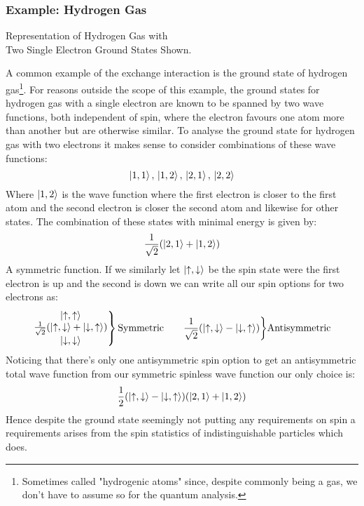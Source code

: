 \subsubsection{Example: Hydrogen Gas}
\begin{center}

Representation of Hydrogen Gas with \\Two Single Electron Ground States Shown.
\end{center}
A common example of the exchange interaction is the ground state of hydrogen gas\footnote{Sometimes called "hydrogenic atoms" since,
despite commonly being a gas,
we don't have to assume so for the quantum analysis.}.
For reasons outside the scope of this example,
the ground states for hydrogen gas with a single electron are known to be spanned by two wave functions,
both independent of spin,
where the electron favours one atom more than another but are otherwise similar.
To analyse the ground state for hydrogen gas with two electrons it makes sense to consider combinations of these wave functions:
\[\left|1,1\right\rangle,\,\left|1,2\right\rangle,\,\left|2,1\right\rangle,\,\left|2,2\right\rangle\]
Where $\left|1,2\right\rangle$ is the wave function where the first electron is closer to the first atom and the second electron is closer the second atom and likewise for other states.
The combination of these states with minimal energy is given by:
\[\frac{1}{\sqrt{2}}(\left|2,1\right\rangle+\left|1,2\right\rangle)\]
A symmetric function.
If we similarly let $\left|\uparrow,\downarrow\right\rangle$ be the spin state were the first electron is up and the second is down we can write all our spin options for two electrons as:
\[\left.\begin{matrix}\left|\uparrow,\uparrow\right\rangle\\\frac{1}{\sqrt{2}}(\left|\uparrow,\downarrow\right\rangle+\left|\downarrow,\uparrow\right\rangle)\\\left|\downarrow,\downarrow\right\rangle\end{matrix}\right\}\text{Symmetric}\quad\quad\frac{1}{\sqrt{2}}(\left|\uparrow,\downarrow\right\rangle-\left|\downarrow,\uparrow\right\rangle)\bigg\}\text{Antisymmetric}\]
Noticing that there's only one antisymmetric spin option to get an antisymmetric total wave function from our symmetric spinless wave function our only choice is:
\[\frac{1}{2}(\left|\uparrow,\downarrow\right\rangle-\left|\downarrow,\uparrow\right\rangle)(\left|2,1\right\rangle+\left|1,2\right\rangle)\]
Hence despite the ground state seemingly not putting any requirements on spin a requirements arises from the spin statistics of indistinguishable particles which does.
\\

